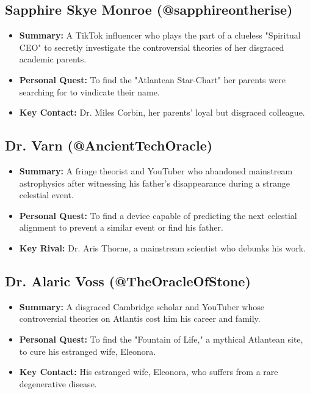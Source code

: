 \documentclass[10pt, a4paper]{article}
\begin{document}
\subsection*{Sapphire Skye Monroe (@sapphireontherise)}
\begin{itemize}
    \item \textbf{Summary:} A TikTok influencer who plays the part of a clueless "Spiritual CEO" to secretly investigate the controversial theories of her disgraced academic parents.
    \item \textbf{Personal Quest:} To find the "Atlantean Star-Chart" her parents were searching for to vindicate their name.
    \item \textbf{Key Contact:} Dr. Miles Corbin, her parents' loyal but disgraced colleague.
\end{itemize}

\subsection*{Dr. Varn (@AncientTechOracle)}
\begin{itemize}
    \item \textbf{Summary:} A fringe theorist and YouTuber who abandoned mainstream astrophysics after witnessing his father's disappearance during a strange celestial event.
    \item \textbf{Personal Quest:} To find a device capable of predicting the next celestial alignment to prevent a similar event or find his father.
    \item \textbf{Key Rival:} Dr. Aris Thorne, a mainstream scientist who debunks his work.
\end{itemize}

\subsection*{Dr. Alaric Voss (@TheOracleOfStone)}
\begin{itemize}
    \item \textbf{Summary:} A disgraced Cambridge scholar and YouTuber whose controversial theories on Atlantis cost him his career and family.
    \item \textbf{Personal Quest:} To find the "Fountain of Life," a mythical Atlantean site, to cure his estranged wife, Eleonora.
    \item \textbf{Key Contact:} His estranged wife, Eleonora, who suffers from a rare degenerative disease.
\end{itemize}
\end{document}
